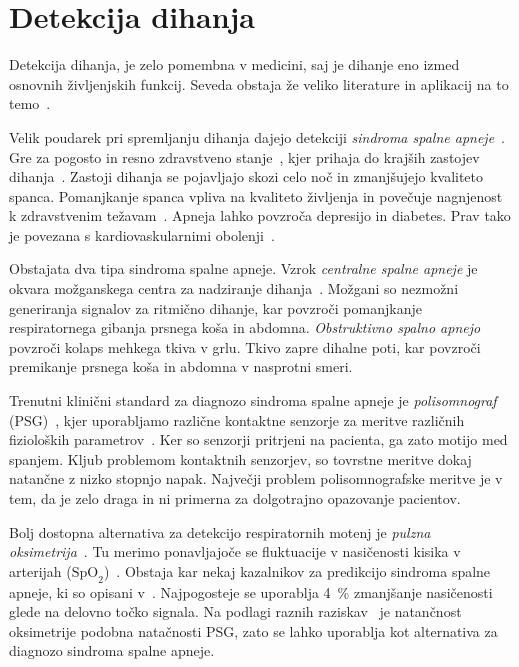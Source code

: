\section{Detekcija dihanja}\label{sec:detekcija-dihanja}
Detekcija dihanja, je zelo pomembna v medicini, saj je dihanje eno izmed osnovnih življenjskih funkcij. Seveda obstaja že veliko literature in aplikacij na to temo~\cite{sathyanarayana2015vision}.

Velik poudarek pri spremljanju dihanja dajejo detekciji  \emph{sindroma spalne apneje}~\cite{sathyanarayana2015vision}. Gre za pogosto in resno zdravstveno stanje~\cite{wang2006vision}, kjer prihaja do krajših zastojev dihanja~\cite{flemons2002obstructive}. Zastoji dihanja se pojavljajo skozi celo noč in zmanjšujejo kvaliteto spanca. Pomanjkanje spanca vpliva na kvaliteto življenja in povečuje nagnjenost k zdravstvenim težavam~\cite{malhotra2002obstructive}. Apneja lahko povzroča depresijo in diabetes. Prav tako je povezana s kardiovaskularnimi obolenji~\cite{takemura2005respiratory}.

Obstajata dva tipa sindroma spalne apneje. Vzrok \emph{centralne spalne apneje} je okvara možganskega centra za nadziranje dihanja~\cite{javaheri2010central}. Možgani so nezmožni generiranja signalov za ritmično dihanje, kar povzroči pomanjkanje respiratornega gibanja prsnega koša in abdomna. \emph{Obstruktivno spalno apnejo} povzroči kolaps mehkega tkiva v grlu. Tkivo zapre dihalne poti, kar povzroči premikanje prsnega koša in abdomna v nasprotni smeri.

Trenutni klinični standard za diagnozo sindroma spalne apneje je \emph{polisomnograf} (PSG)~\cite{collop2007clinical}, kjer uporabljamo različne kontaktne senzorje za meritve različnih fizioloških parametrov~\cite{heinrich2015video}. Ker so senzorji pritrjeni na pacienta, ga zato motijo med spanjem. Kljub problemom kontaktnih senzorjev, so tovrstne meritve dokaj natančne z nizko stopnjo napak. Največji problem polisomnografske meritve je v tem, da je zelo draga in ni primerna za dolgotrajno opazovanje pacientov.

Bolj dostopna alternativa za detekcijo respiratornih motenj je \emph{pulzna oksimetrija}~\cite{netzer2001overnight}. Tu merimo ponavljajoče se fluktuacije v nasičenosti kisika v arterijah ($\mathrm{SpO}_{2}$)~\cite{levy1996accuracy}. Obstaja kar nekaj kazalnikov za predikcijo sindroma spalne apneje, ki so opisani v~\cite{netzer2001overnight, magalang2003prediction}. Najpogosteje se uporablja \SI{4}{\%} zmanjšanje nasičenosti glede na delovno točko signala. Na podlagi raznih raziskav~\cite{cooper1991value,magalang2003prediction,netzer2001overnight,levy1996accuracy} je natančnost oksimetrije podobna natačnosti PSG, zato se lahko uporablja kot alternativa za diagnozo sindroma spalne apneje.

